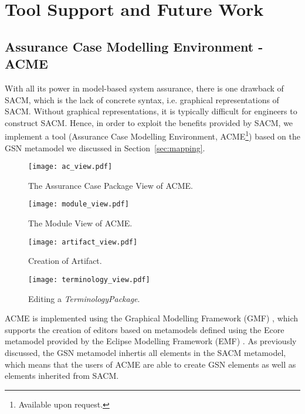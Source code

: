 \section{Tool Support and Future Work}
\label{sec:toolsupport}
\subsection{Assurance Case Modelling Environment - ACME}
With all its power in model-based system assurance, there is one drawback of SACM, which is the lack of concrete syntax, i.e. graphical representations of SACM. Without graphical representations, it is typically difficult for engineers to construct SACM. 
Hence, in order to exploit the benefits provided by SACM, we implement a tool (Assurance Case Modelling Environment, ACME\footnote{Available upon request. }) based on the GSN metamodel we discussed in Section~\ref{sec:mapping}. 

\begin{figure}
	\centering
	\begin{minipage}[b]{0.49\textwidth}
		\texttt{[image: ac\_view.pdf]}
		\caption{The Assurance Case Package View of ACME.}
		\label{fig:ac_view}
	\end{minipage}
	\hfill
	\begin{minipage}[b]{0.49\textwidth}
		\texttt{[image: module\_view.pdf]}
		\caption{The Module View of ACME.}
		\label{fig:module_view}
	\end{minipage}
\end{figure}

\begin{figure}
	\centering
	\texttt{[image: artifact\_view.pdf]}
	\caption{Creation of Artifact.}
	\label{fig:artifact_view}
\end{figure}

\begin{figure}
	\centering
	\texttt{[image: terminology\_view.pdf]}
	\caption{Editing a \textit{TerminologyPackage}.}
	\label{fig:terminology_view}
\end{figure}

ACME is implemented using the Graphical Modelling Framework (GMF) \cite{gmf}, which supports the creation of editors based on metamodels defined using the Ecore metamodel provided by the Eclipse Modelling Framework (EMF) \cite{steinberg2008emf}. As previously discussed, the GSN metamodel inhertis all elements in the SACM metamodel, which means that the users of ACME are able to create GSN elements as well as elements inherited from SACM.

